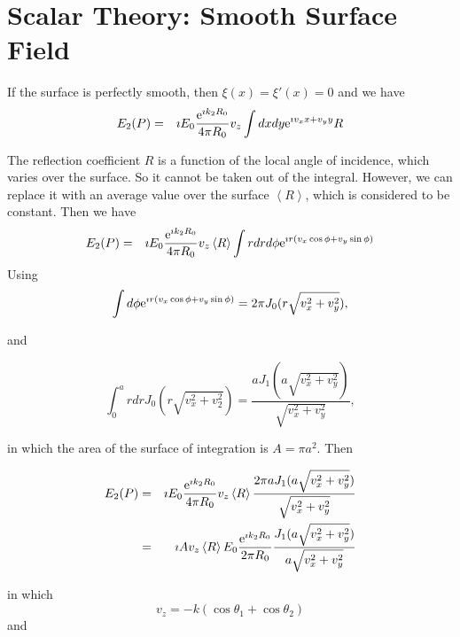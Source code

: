 \documentclass[11pt,openany]{report}
\newcommand{\e}{{\rm e}}
\begin{document}
{{%
\section{Scalar Theory: Smooth Surface Field}

If the surface is perfectly smooth, then $\xi(x)=\xi'(x)=0$ and we have
\begin{eqnarray}
E_{2}(P)&=&\imath  E_{0}\frac{\e^{\imath k_{2}R_{0}}}{4\pi R_{0}}v_{z}
\int dx dy\e^{\imath v_{x}x+v_{y}y}R
\end{eqnarray}

The reflection coefficient $R$ is a function of the local angle of
incidence, which varies over the surface.  So it cannot be taken out
of the integral. However, we can replace it with an average value over
the surface $\left<R\right>$, which is considered to be constant. Then
we have 
  \begin{eqnarray} E_{2}(P)&=&\imath E_{0}\frac{\e^{\imath
k_{2}R_{0}}}{4\pi R_{0}}v_{z}\left<R\right>\int rdr d\phi\e^{\imath
r(v_{x}\cos\phi+v_{y}\sin\phi)}
  \end{eqnarray}
Using
  \begin{equation}
\int d\phi\e^{\imath r(v_{x}\cos\phi+v_{y}\sin\phi)}=2\pi J_{0}(r\sqrt{v_{x}^{2}+v_{y}^{2}}),
  \end{equation}

and

   \begin{equation}
\int_{0}^{a}rdrJ_{0}(r\sqrt{v_{x}^{2}+v_{2}^{2}})=
\frac{aJ_{1}(a\sqrt{v_{x}^{2}+v_{y}^{2}})}{\sqrt{v_{x}^{2}+v_{y}^{2}}},
  \end{equation}
 
 in which the area of the surface of integration is $A=\pi a^{2}.$ Then

\begin{eqnarray}
E_{2}(P)&=&\imath  E_{0}\frac{\e^{\imath k_{2}R_{0}}}{4\pi R_{0}}v_{z}\left<R\right>\frac{2\pi aJ_{1}(a\sqrt{v_{x}^{2}+v_{y}^{2}})}{\sqrt{v_{x}^{2}+v_{y}^{2}}}\\
&=&\imath  Av_{z}\left<R\right>E_{0}\frac{\e^{\imath k_{2}R_{0}}}{2\pi R_{0}}\frac{J_{1}(a\sqrt{v_{x}^{2}+v_{y}^{2}})}{a\sqrt{v_{x}^{2}+v_{y}^{2}}}\end{eqnarray}

in which 
  \begin{equation}
v_{z}=-k(\cos{\theta_{1}}+\cos{\theta_{2}})
  \end{equation}
and

}}
\end{document}
